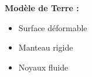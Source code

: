 \begin{frame}

	\begin{minipage}{0.55\textwidth}
	\centering
	\end{minipage}
	\hfil
	\begin{minipage}{0.35\textwidth}
	\textbf{Modèle de Terre :}
	      \begin{itemize}
	        \item Surface déformable
	        \item Manteau rigide
	        \item Noyaux fluide
	      \end{itemize}
	\end{minipage}




\end{frame}

